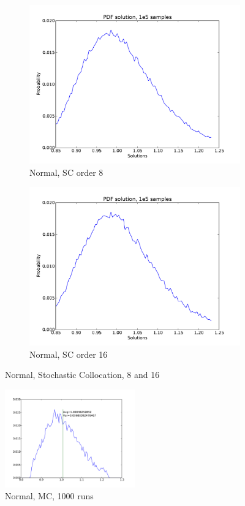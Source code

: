 \documentclass[11pt]{article} %
\begin{document}
\begin{figure}[h!]
\centering
  \begin{subfigure}[b]{0.45 \textwidth}
   \includegraphics[width=\textwidth]{1d_sc_8_n}
   \caption{Normal, SC order 8}
   \label{sc8}
  \end{subfigure}
  \begin{subfigure}[b]{0.45\textwidth}
   \includegraphics[width=\textwidth]{1d_sc_16_n}
   \caption{Normal, SC order 16}
   \label{sc16}
  \end{subfigure}
\caption{Normal, Stochastic Collocation, 8 and 16}
\end{figure}
\begin{figure}[h!]
\centering
   \includegraphics[width=0.5\textwidth]{1d_mc_siga_normal_1000}
   \caption{Normal, MC, 1000 runs }
   \label{mc}
\end{figure}
\end{document}
